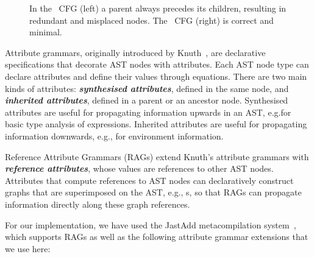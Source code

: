 \begin{figure}
\hspace{-1.1cm}
\scalebox{0.865}{
  
 }
\caption{In the \ParentFirst\  CFG (left) a parent always precedes its children, resulting in redundant and misplaced nodes.
The \ASTUnrestricted\ CFG (right) is correct and minimal.}
  \label{fig:semanticsvssyntax}
\end{figure}
%
Attribute grammars, originally introduced by Knuth~\cite{knuth1968semantics}, are declarative specifications that decorate AST nodes with attributes.
Each AST node type can declare attributes and define their values through equations.
There are two main kinds of attributes: \textbf{\emph{synthesised attributes}}, defined in the same node, and \textbf{\emph{inherited attributes}}, defined in a parent or an ancestor node.
Synthesised attributes are useful for propagating information upwards in an AST, e.g.\@ for basic type analysis of expressions.
Inherited attributes are useful for propagating information downwards, e.g., for environment information.

Reference Attribute Grammars (RAGs) \cite{hedin2000rags} extend Knuth's
attribute grammars with \textbf{\emph{reference attributes}}, whose values are references to other AST nodes.
Attributes that compute references to AST nodes can declaratively construct graphs that are superimposed on the AST, e.g., {\CFG}s, so that RAGs can propagate information directly along these graph references.

For our implementation, we have used the JastAdd metacompilation system~\cite{hedin2003jastadd}, which supports RAGs as well as the following attribute grammar extensions that we use here:

